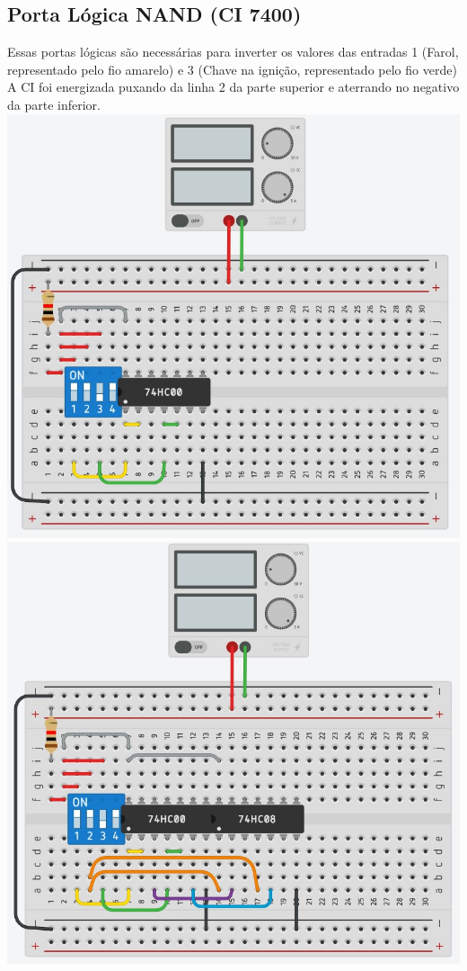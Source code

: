 \documentclass[]{article}
\begin{document}
		\subsection{Porta Lógica NAND (CI 7400)}
			Essas portas lógicas são necessárias para inverter os valores das entradas 1 (Farol, representado pelo fio amarelo) e 3 (Chave na ignição, representado pelo fio verde) \\
			A CI foi energizada puxando da linha 2 da parte superior e aterrando no negativo da parte inferior. \\
			\includegraphics[scale=0.6]{Images/Tinkercad 02.jpg} \\
		\includegraphics[scale=0.6]{Images/Tinkercad 03.jpg} \\
\end{document}

